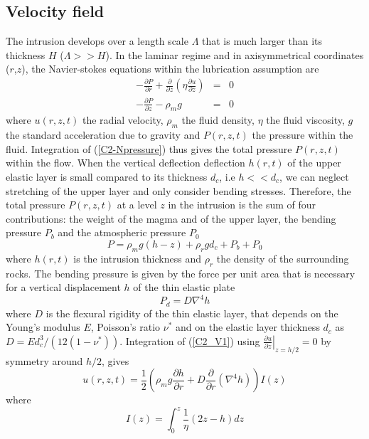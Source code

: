 \subsection{Velocity field}
\label{sec:Velocity field}

The  intrusion develops  over a  length scale  $\Lambda$ that  is much
larger than its thickness $H$ ($\Lambda >> H$).  In the laminar regime
and  in   axisymmetrical  coordinates  ($r$,$z$),   the  Navier-stokes
equations within the lubrication assumption are
\begin{eqnarray}
  -\frac{\partial P}{\partial r}  +  \frac{\partial}{\partial z}\left(\eta \frac{\partial u}{\partial z}\right) &=&0\label{C2_V1} \\
  -\frac{\partial P}{\partial z}  - \rho_{m}g&  =&0\label{C2-Npressure}
\end{eqnarray}
where  $u(r,z,t)$ the  radial  velocity, $\rho_m$  the fluid  density,
$\eta$  the fluid  viscosity,  $g$ the  standard  acceleration due  to
gravity and $P(r,z,t)$ the pressure  within the fluid.  Integration of
(\ref{C2-Npressure}) thus  gives the total pressure  $P(r,z,t)$ within
the flow.   When the  vertical deflection  deflection $h(r,t)$  of the
upper  elastic layer  is small  compared to  its thickness  $d_c$, i.e
$h<<d_c$,  we can  neglect  stretching  of the  upper  layer and  only
consider bending stresses. Therefore, the total pressure $P(r,z,t)$ at
a level  $z$ in the  intrusion is the  sum of four  contributions: the
weight of the magma and of the upper layer, the bending pressure $P_b$
and the atmospheric pressure $P_0$
\begin{equation}
  P = \rho_m g (h-z)+\rho_rgd_c+P_b+P_0
\end{equation}
where $h(r,t)$ is the intrusion thickness and $\rho_r$ the density of the
surrounding rocks. The bending pressure is given by the force per unit
area that  is necessary for  a vertical  displacement $h$ of  the thin
elastic plate \citep{Turcotte:1982ca}
\begin{equation}
  P_d = D\nabla^4h
\end{equation}
where $D$  is the flexural  rigidity of  the thin elastic  layer, that
depends on the Young's modulus $E$, Poisson's ratio $\nu^*$ and on the
elastic           layer          thickness           $d_c$          as
$D =  Ed_c^3/\left(12(1-\nu^*)\right)$.  Integration  of (\ref{C2_V1})
using   $\left.\frac{\partial   u}{\partial  z}\right|_{z=h/2}=0$   by
symmetry around $h/2$, gives
\begin{equation}
  u(r,z,t)=\frac{1}{2}\left(\rho_m g \frac{\partial h}{\partial      r}+D\frac{\partial}{\partial      r}\left(\nabla^4h\right)\right)I(z)
  \label{C2-V2}
\end{equation}
where 
\begin{equation}
I(z) = \int_0^z  \frac{1}{\eta}\left( 2 z -h\right)dz
\end{equation}
